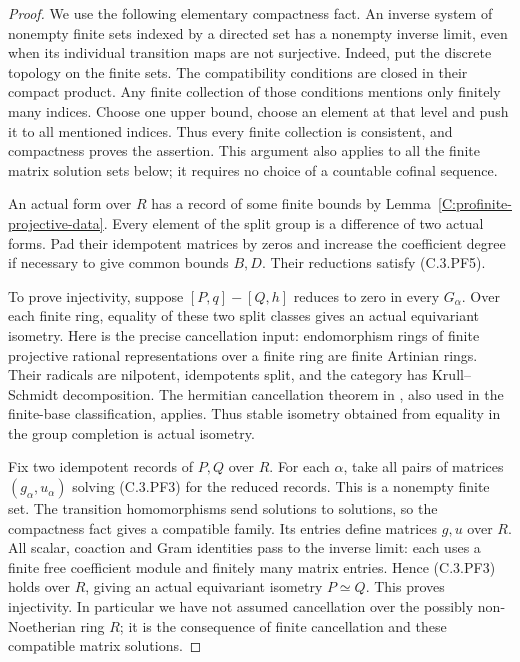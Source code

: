 \begin{proof}
We use the following elementary compactness fact.
An inverse system of nonempty finite sets indexed
by a directed set has a nonempty inverse limit,
even when its individual transition maps are not
surjective. Indeed, put the discrete topology on
the finite sets. The compatibility conditions
are closed in their compact product.
Any finite collection of those conditions mentions
only finitely many indices. Choose one upper bound,
choose an element at that level and push it to
all mentioned indices. Thus every finite collection
is consistent, and compactness proves the assertion.
This argument also applies to all the finite
matrix solution sets below; it requires no
choice of a countable cofinal sequence.

An actual form over $R$ has a record of some
finite bounds by
Lemma~\ref{C:profinite-projective-data}.
Every element of the split group is a difference
of two actual forms. Pad their idempotent matrices
by zeros and increase the coefficient degree
if necessary to give common bounds $B,D$.
Their reductions satisfy (C.3.PF5).

To prove injectivity, suppose
$[P,q]-[Q,h]$ reduces to zero in every $G_\alpha$.
Over each finite ring, equality of these two
split classes gives an actual equivariant isometry.
Here is the precise cancellation input:
endomorphism rings of finite projective rational
representations over a finite ring are finite
Artinian rings. Their radicals are nilpotent,
idempotents split, and the category has
Krull--Schmidt decomposition.
The hermitian cancellation theorem in
\cite[Theorems 3.2--3.3 and Section 3.4(1),
pp.\ 272--273]{C-QSS1979}, also used in the
finite-base classification, applies.
Thus stable isometry obtained from equality in
the group completion is actual isometry.

Fix two idempotent records of $P,Q$ over $R$.
For each $\alpha$, take all pairs of matrices
$(g_\alpha,u_\alpha)$ solving (C.3.PF3) for the
reduced records. This is a nonempty finite set.
The transition homomorphisms send solutions to
solutions, so the compactness fact gives a
compatible family. Its entries define matrices
$g,u$ over $R$.
All scalar, coaction and Gram identities pass
to the inverse limit: each uses a finite free
coefficient module and finitely many matrix
entries. Hence (C.3.PF3) holds over $R$, giving
an actual equivariant isometry $P\simeq Q$.
This proves injectivity.
In particular we have not assumed cancellation
over the possibly non-Noetherian ring $R$;
it is the consequence of finite cancellation
and these compatible matrix solutions.


\end{proof}
